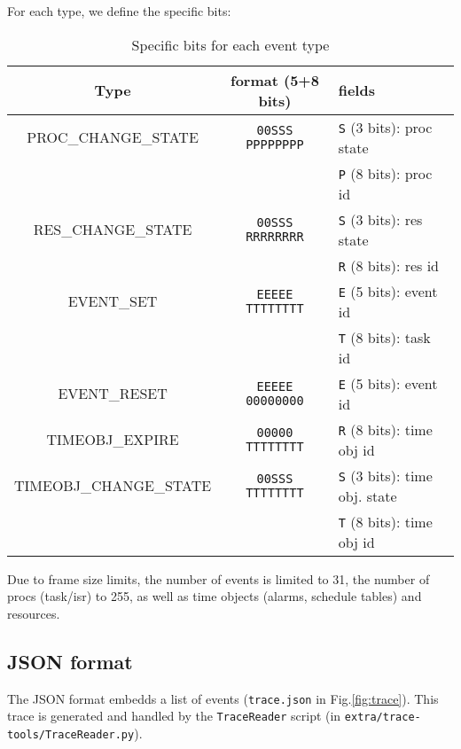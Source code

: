 For each type, we define the specific bits:

\begin{table}[htbp]
	\begin{longtable}[c]{c|c|l}
		\bf Type & \bf format (5+8 bits) & \bf fields \\ \hline
		PROC\_CHANGE\_STATE    & \texttt{00SSS PPPPPPPP}& \texttt{S} (3 bits): proc state \\
		                       &                        & \texttt{P} (8 bits): proc id    \\ \hline
		RES\_CHANGE\_STATE     & \texttt{00SSS RRRRRRRR}& \texttt{S} (3 bits): res state  \\
		                       &                        & \texttt{R} (8 bits): res id     \\ \hline
		EVENT\_SET             & \texttt{EEEEE TTTTTTTT}& \texttt{E} (5 bits): event id   \\
		                       &                        & \texttt{T} (8 bits): task id     \\ \hline
		EVENT\_RESET           & \texttt{EEEEE 00000000}& \texttt{E} (5 bits): event id   \\ \hline
		TIMEOBJ\_EXPIRE        & \texttt{00000 TTTTTTTT}& \texttt{R} (8 bits): time obj id    \\ \hline
		TIMEOBJ\_CHANGE\_STATE & \texttt{00SSS TTTTTTTT}& \texttt{S} (3 bits): time obj. state \\
		                       &                        & \texttt{T} (8 bits): time obj id    \\ \hline
	\end{longtable}
	\caption{Specific bits for each event type}
	\label{tab:traceBin}
\end{table}

Due to frame size limits, the number of events is limited to 31, the number of procs (task/isr) to 255, as well as time objects (alarms, schedule tables) and resources.

\subsection{JSON format}
\label{sec:traceJSONFormat}

The JSON format embedds a list of events (\texttt{trace.json} in Fig.\ref{fig:trace}). This trace is generated and handled by the \texttt{TraceReader} script (in \texttt{extra/trace-tools/TraceReader.py}). 

